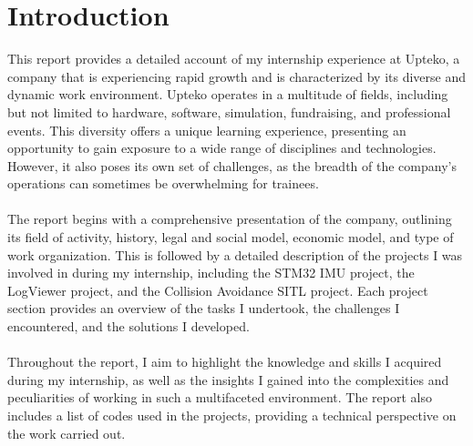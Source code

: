 \chapter*{Introduction}

This report provides a detailed account of my internship experience at Upteko, a company that is experiencing rapid growth and is characterized by its diverse and dynamic work environment. Upteko operates in a multitude of fields, including but not limited to hardware, software, simulation, fundraising, and professional events. This diversity offers a unique learning experience, presenting an opportunity to gain exposure to a wide range of disciplines and technologies. However, it also poses its own set of challenges, as the breadth of the company's operations can sometimes be overwhelming for trainees.
\\ \\
The report begins with a comprehensive presentation of the company, outlining its field of activity, history, legal and social model, economic model, and type of work organization. This is followed by a detailed description of the projects I was involved in during my internship, including the STM32 IMU project, the LogViewer project, and the Collision Avoidance SITL project. Each project section provides an overview of the tasks I undertook, the challenges I encountered, and the solutions I developed.
\\ \\
Throughout the report, I aim to highlight the knowledge and skills I acquired during my internship, as well as the insights I gained into the complexities and peculiarities of working in such a multifaceted environment. The report also includes a list of codes used in the projects, providing a technical perspective on the work carried out.